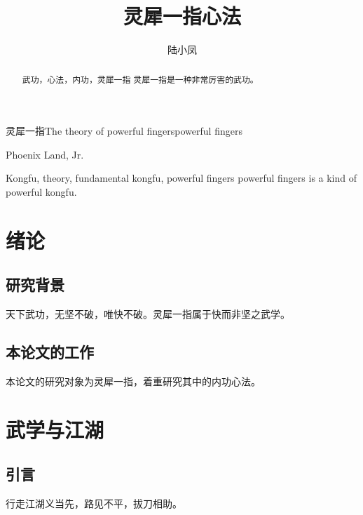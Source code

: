\documentclass[algorithmlist, figurelist,tablelist, nomlist,masters]{seuthesix}
\begin{document}
\title{灵犀一指心法}{灵犀一指}{The theory of powerful fingers}{powerful fingers}
\author{陆小凤}{Phoenix Land, Jr.}
\authorizedate{\today}
\makebigcover
\makecover
\begin{abstract}{武功，心法，内功，灵犀一指}
灵犀一指是一种非常厉害的武功。
\end{abstract}

\begin{englishabstract}{Kongfu, theory, fundamental kongfu, powerful fingers}
 powerful fingers is a kind of powerful kongfu.
\end{englishabstract}

\tableofcontents
\listofothers

\mainmatter

\chapter{绪论}
\section{研究背景}
天下武功，无坚不破，唯快不破。灵犀一指属于快而非坚之武学。


\section{本论文的工作}
本论文的研究对象为灵犀一指，着重研究其中的内功心法。



\chapter{武学与江湖}

\section{引言}
行走江湖义当先，路见不平，拔刀相助。
\end{document}
